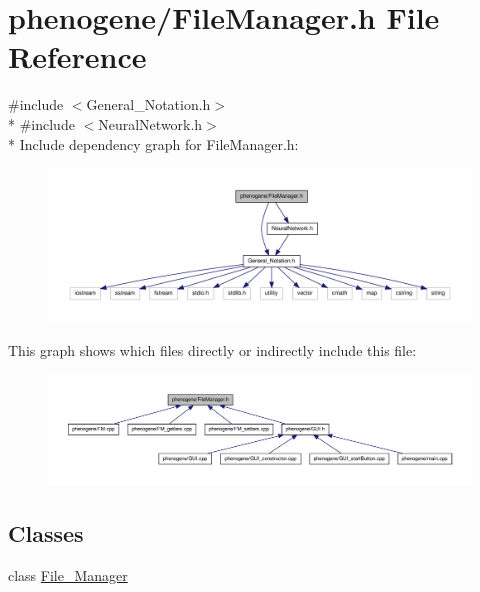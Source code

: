 \hypertarget{a00004}{\section{phenogene/\-File\-Manager.h File Reference}
\label{d0/d0b/a00004}
}
{\ttfamily \#include $<$General\-\_\-\-Notation.\-h$>$}\\*
{\ttfamily \#include $<$Neural\-Network.\-h$>$}\\*
Include dependency graph for File\-Manager.\-h\-:
\nopagebreak
\begin{figure}[H]
\begin{center}
\leavevmode
\includegraphics[width=350pt]{de/d11/a00021}
\end{center}
\end{figure}
This graph shows which files directly or indirectly include this file\-:
\nopagebreak
\begin{figure}[H]
\begin{center}
\leavevmode
\includegraphics[width=350pt]{d7/de0/a00022}
\end{center}
\end{figure}
\subsection*{Classes}
\begin{DoxyCompactItemize}
\item 
class \hyperlink{a00001}{File\-\_\-\-Manager}
\end{DoxyCompactItemize}
